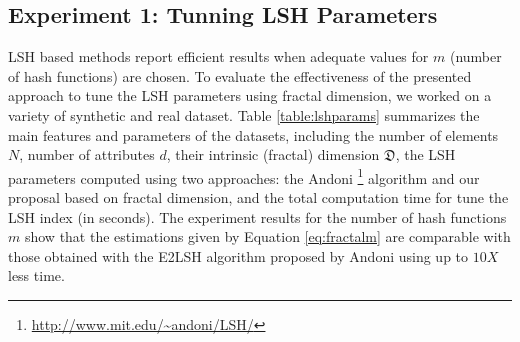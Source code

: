 \documentclass[conference]{IEEEtran}
\begin{document}
\subsection{Experiment 1: Tunning LSH Parameters}

LSH based methods report efficient results when adequate values for $m$ (number of hash functions) are chosen. To evaluate the effectiveness of the presented approach to tune the LSH parameters using fractal dimension, we worked on a variety of synthetic and real dataset. Table \ref{table:lshparams} summarizes the main features and parameters of the datasets, including the number of elements $N$, number of attributes $d$,   their intrinsic (fractal) dimension $\mathfrak{D}$, the LSH parameters computed using two approaches: the Andoni \footnote{\url{http://www.mit.edu/~andoni/LSH/}} algorithm and our proposal based on fractal dimension, and the total computation time for tune the LSH index (in seconds).  The experiment results for the number of hash functions $m$  show that the estimations given by Equation \ref{eq:fractalm} are comparable with those obtained with the E2LSH algorithm proposed by Andoni using up to $10X$ less time.
 
\end{document}
